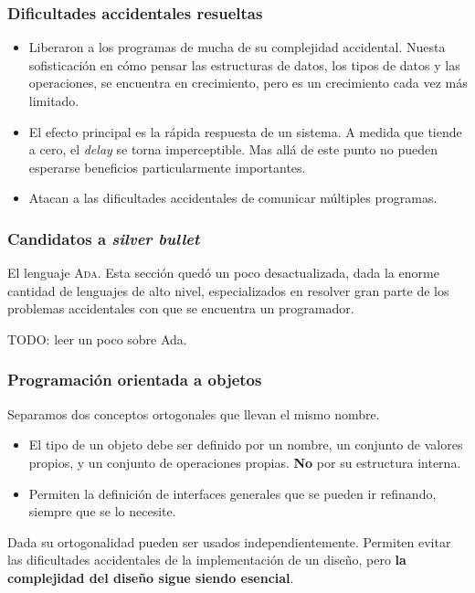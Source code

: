 \documentclass{beamer}
\begin{document}
\begin{frame}[fragile]
  \frametitle{Dificultades accidentales resueltas}

  \begin{itemize}
    \item[Lenguajes de alto nivel]
      Liberaron a los programas de mucha de su complejidad accidental.
      Nuesta sofisticaci\'on en c\'omo pensar las estructuras de datos, los tipos
      de datos y las operaciones, se encuentra en crecimiento, pero es un crecimiento
      cada vez m\'as limitado.
    \item[Tiempo compartido]
      El efecto principal es la r\'apida respuesta de un sistema. A medida que
      tiende a cero, el \textit{delay} se torna imperceptible. Mas all\'a de
      este punto no pueden esperarse beneficios particularmente importantes.
    \item[Ambientes de programaci\'on unificados]
      Atacan a las dificultades accidentales de comunicar m\'ultiples programas.
  \end{itemize}
\end{frame}


\begin{frame}[fragile]
  \frametitle{Candidatos a \textit{silver bullet}}

  El lenguaje \textsc{Ada}.
  Esta secci\'on qued\'o un poco desactualizada, dada la enorme cantidad de
  lenguajes de alto nivel, especializados en resolver gran parte de los
  problemas accidentales con que se encuentra un programador.

  TODO: leer un poco sobre Ada.
\end{frame}


\begin{frame}[fragile]
  \frametitle{Programaci\'on orientada a objetos}
  Separamos dos conceptos ortogonales que llevan el mismo nombre.
  \begin{itemize}
    \item[Tipos abstractos de datos] El tipo de un objeto debe ser
      definido por un nombre, un conjunto de valores propios, y un conjunto
      de operaciones propias. \textbf{No} por su estructura interna.
    \item[Tipos jer\'arquicos] Permiten la definici\'on de interfaces generales
      que se pueden ir refinando, siempre que se lo necesite.
  \end{itemize}

  Dada su ortogonalidad pueden ser usados independientemente.
  Permiten evitar las dificultades accidentales de la implementaci\'on de un
  dise\~no, pero \textbf{la complejidad del dise\~no sigue siendo esencial}.
\end{frame}
\end{document}
